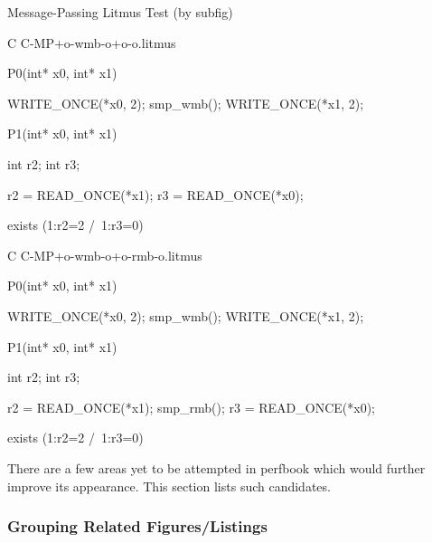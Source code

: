 \begin{listing*}[tbh]%
\caption{Message-Passing Litmus Test (by subfig)}%
\label{lst:app:styleguide:Message-Passing Litmus Test (subfig)}%
{\scriptsize%
\begin{verbbox}[\LstLineNo]
C C-MP+o-wmb-o+o-o.litmus

{
}

P0(int* x0, int* x1) {

  WRITE_ONCE(*x0, 2);
  smp_wmb();
  WRITE_ONCE(*x1, 2);

}

P1(int* x0, int* x1) {

  int r2;
  int r3;

  r2 = READ_ONCE(*x1);
  r3 = READ_ONCE(*x0);

}


exists (1:r2=2 /\ 1:r3=0)
\end{verbbox}
}
\centering
\hspace*{\fill}
\hspace{\fill}
{\scriptsize%
\begin{verbbox}[\LstLineNo]
C C-MP+o-wmb-o+o-rmb-o.litmus

{
}

P0(int* x0, int* x1) {

  WRITE_ONCE(*x0, 2);
  smp_wmb();
  WRITE_ONCE(*x1, 2);

}

P1(int* x0, int* x1) {

  int r2;
  int r3;

  r2 = READ_ONCE(*x1);
  smp_rmb();
  r3 = READ_ONCE(*x0);

}

exists (1:r2=2 /\ 1:r3=0)
\end{verbbox}
}%
\hspace*{\fill}%
\end{listing*}

There are a few areas yet to be attempted in perfbook
which would further improve its appearance.
This section lists such candidates.

\subsubsection{Grouping Related Figures/Listings}
\label{sec:app:styleguide:Grouping Related Figures/Listings}

